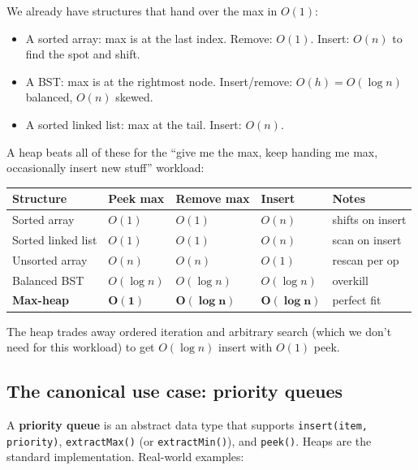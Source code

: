 \documentclass[11pt]{article}
\begin{document}
We already have structures that hand over the max in $O(1)$:
\begin{itemize}[leftmargin=*]
    \item A sorted array: max is at the last index. Remove: $O(1)$. Insert: $O(n)$ to find the spot and shift.
    \item A BST: max is at the rightmost node. Insert/remove: $O(h) = O(\log n)$ balanced, $O(n)$ skewed.
    \item A sorted linked list: max at the tail. Insert: $O(n)$.
\end{itemize}

A heap beats all of these for the ``give me the max, keep handing me max, occasionally insert new stuff'' workload:

\begin{center}
\begin{tabular}{lllll}
Structure & Peek max & Remove max & Insert & Notes \\
\hline
Sorted array         & $O(1)$ & $O(1)$      & $O(n)$ & shifts on insert \\
Sorted linked list   & $O(1)$ & $O(1)$      & $O(n)$ & scan on insert \\
Unsorted array       & $O(n)$ & $O(n)$      & $O(1)$ & rescan per op \\
Balanced BST         & $O(\log n)$ & $O(\log n)$ & $O(\log n)$ & overkill \\
\textbf{Max-heap}    & $\mathbf{O(1)}$ & $\mathbf{O(\log n)}$ & $\mathbf{O(\log n)}$ & perfect fit \\
\end{tabular}
\end{center}

The heap trades away ordered iteration and arbitrary search (which we don't need for this workload) to get $O(\log n)$ insert with $O(1)$ peek.

\subsection*{The canonical use case: priority queues}

A \textbf{priority queue} is an abstract data type that supports \texttt{insert(item, priority)}, \texttt{extractMax()} (or \texttt{extractMin()}), and \texttt{peek()}. Heaps are the standard implementation. Real-world examples:
\end{document}
